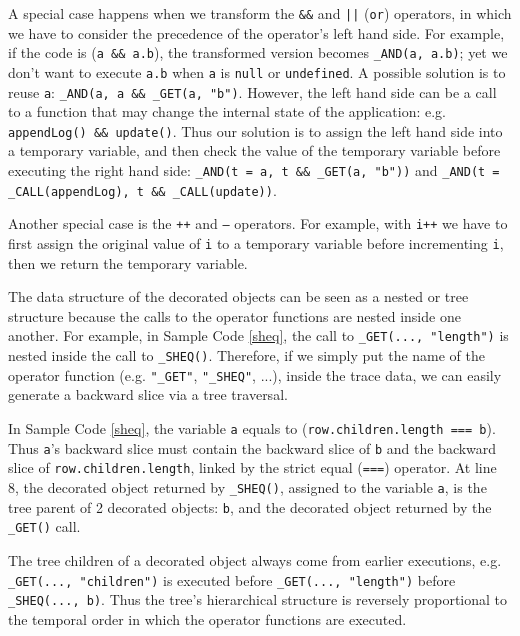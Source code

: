A special case happens when we transform the {\tt \&\&} and {\tt |}{\tt |} ({\tt or}) operators, in which we have to consider the precedence of the operator's left hand side.   
For example, if the code is ({\tt a \&\& a.b}), the transformed version becomes {\tt \_AND(a, a.b)}; yet we don't want to execute {\tt a.b} when {\tt a} is {\tt null} or {\tt undefined}.  
A possible solution is to reuse {\tt a}: {\tt \_AND(a, a \&\& \_GET(a, "b")}.  
However, the left hand side can be a call to a function that may change the internal state of the application: e.g. {\tt appendLog() \&\& update()}.
Thus our solution is to assign the left hand side into a temporary variable, and then check the value of the temporary variable before executing the right hand side: 
{\tt \_AND(t = a, t \&\& \_GET(a, "b"))} and {\tt \_AND(t = \_CALL(appendLog), t \&\& \_CALL(update))}.  

Another special case is the {\tt ++} and {\tt ---} operators.  
For example, with {\tt i++} we have to first assign the original value of {\tt i} to a temporary variable before incrementing {\tt i}, then we return the temporary variable.


The data structure of the decorated objects can be seen as a nested or tree structure because the calls to the operator functions are nested inside one another.  
For example, in Sample Code \ref{sheq}, the call to {\tt \_GET(..., "length")} is nested inside the call to {\tt \_SHEQ()}.  
Therefore, if we simply put the name of the operator function (e.g. {\tt "\_GET"}, {\tt "\_SHEQ"}, ...), inside the trace data, we can easily generate a backward slice via a tree traversal.  

In Sample Code \ref{sheq}, the variable {\tt a} equals to ({\tt row.children.length === b}).  
Thus {\tt a}'s backward slice must contain the backward slice of {\tt b} and the backward slice of {\tt row.children.length}, linked by the strict equal ({\tt ===}) operator.  
At line 8, the decorated object returned by {\tt \_SHEQ()}, assigned to the variable {\tt a}, is the tree parent of 2 decorated objects: {\tt b}, and the decorated object returned by the {\tt \_GET()} call.  

The tree children of a decorated object always come from earlier executions, e.g. {\tt \_GET(..., "children")} is executed before {\tt \_GET(..., "length")} before {\tt \_SHEQ(..., b)}.
Thus the tree's hierarchical structure is reversely proportional to the temporal order in which the operator functions are executed.  

